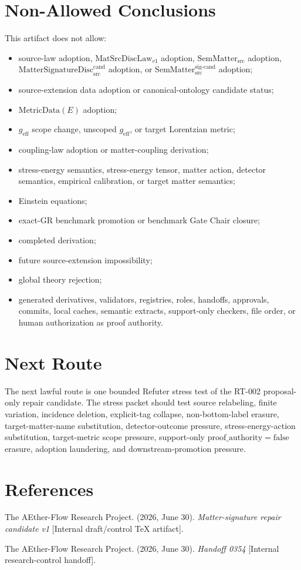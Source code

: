 \documentclass[11pt]{article}
\newcommand{\MetricData}{\mathrm{MetricData}}
\newcommand{\geff}{g_{\mathrm{eff}}}
\newcommand{\MatSrcDiscLaw}{\mathrm{MatSrcDiscLaw}_{v1}}
\newcommand{\SemMatterSrc}{\mathrm{SemMatter}_{\mathrm{src}}}
\newcommand{\SemMatterSig}{\mathrm{SemMatter}_{\mathrm{src}}^{\mathrm{sig\text{-}cand}}}
\newcommand{\MatSigDisc}{\mathrm{MatterSignatureDisc}_{\mathrm{src}}^{\mathrm{cand}}}
\newcommand{\ProofAuthFalse}{\mathrm{proof\_authority=false}}
\begin{document}
\section{Non-Allowed Conclusions}

This artifact does not allow:

\begin{itemize}[leftmargin=*]
\item source-law adoption, \(\MatSrcDiscLaw\) adoption, \(\SemMatterSrc\)
  adoption, \(\MatSigDisc\) adoption, or \(\SemMatterSig\) adoption;
\item source-extension data adoption or canonical-ontology candidate status;
\item \(\MetricData(E)\) adoption;
\item \(\geff\) scope change, unscoped \(\geff\), or target Lorentzian metric;
\item coupling-law adoption or matter-coupling derivation;
\item stress-energy semantics, stress-energy tensor, matter action, detector
  semantics, empirical calibration, or target matter semantics;
\item Einstein equations;
\item exact-GR benchmark promotion or benchmark Gate Chair closure;
\item completed derivation;
\item future source-extension impossibility;
\item global theory rejection;
\item generated derivatives, validators, registries, roles, handoffs,
  approvals, commits, local caches, semantic extracts, support-only checkers,
  file order, or human authorization as proof authority.
\end{itemize}

\section{Next Route}

The next lawful route is one bounded Refuter stress test of the RT-002
proposal-only repair candidate. The stress packet should test source
relabeling, finite variation, incidence deletion, explicit-tag collapse,
non-bottom-label erasure, target-matter-name substitution,
detector-outcome pressure, stress-energy-action substitution, target-metric
scope pressure, support-only \(\ProofAuthFalse\) erasure, adoption laundering,
and downstream-promotion pressure.

\section*{References}

The AEther-Flow Research Project. (2026, June 30). \emph{Matter-signature
repair candidate v1} [Internal draft/control TeX artifact].

The AEther-Flow Research Project. (2026, June 30). \emph{Handoff 0354}
[Internal research-control handoff].
\end{document}
